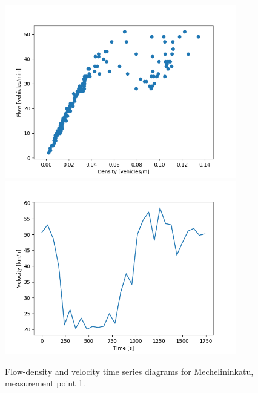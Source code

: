 \documentclass[english, 12pt, a4paper, elec, utf8, pdfa, online]{aaltothesis}
\begin{document}
\begin{figure}[ht!]
    \centering
    \includegraphics[width=0.9\textwidth]{graphs/Mechelininkatu_1_flw_dns.png}
    \includegraphics[width=0.9\textwidth]{graphs/Mechelininkatu_1_spd_time_5.png}
    \caption{Flow-density and velocity time series diagrams for Mechelininkatu, measurement point 1.}
    \label{fig:2}
\end{figure}
\end{document}
